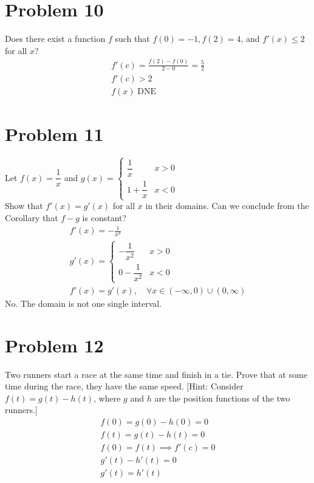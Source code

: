 \documentclass[12pt]{article}
\newcommand{\vem}{\vspace{0.5em}}
\newcommand{\problem}[1]{\section{Problem #1}}
\DeclareMathOperator{\dne}{DNE}
\begin{document}
\problem{10}
Does there exist a function $f$ such that $f(0)=-1, f(2)=4$, and $f'(x) \le 2 $ for all $x$?
\begin{gather*}
    f'(c)=\frac{f(2)-f(0)}{2-0}=\frac{5}{2}\\
    f'(c)>2\\
    \boxed{f(x)\dne}
\end{gather*}

\problem{11}
Let $f(x)=\dfrac{1}{x}$ and $g(x)=\begin{cases}
    \dfrac{1}{x} &x>0\\
    1+\dfrac{1}{x} &x<0
\end{cases}$\\
Show that $f'(x)=g'(x)$ for all $x$ in their domains. Can we conclude from the Corollary that $f-g$ is constant?
\begin{gather*}
    f'(x)=-\frac{1}{x^2}\\
    g'(x)=\begin{cases}
        -\dfrac{1}{x^2} &x>0\\
        0-\dfrac{1}{x^2} &x<0
    \end{cases}\\
    \boxed{f'(x)=g'(x), \quad  \forall x \in (-\infty ,0) \cup (0,\infty)}
\end{gather*}
No. The domain is not one single interval. \vem 

\problem{12}
Two runners start a race at the same time and finish in a tie. Prove that at some time during the race, they have the same speed. [Hint: Consider $f(t)=g(t)-h(t)$, where $g$ and $h$ are the position functions of the two runners.]
\begin{gather*}
    f(0)=g(0)-h(0)=0\\
    f(t)=g(t)-h(t)=0\\
    f(0)=f(t) \implies f'(c)=0\\
    g'(t)-h'(t)=0\\
    \boxed{g'(t)=h'(t)}
\end{gather*}
\end{document}

